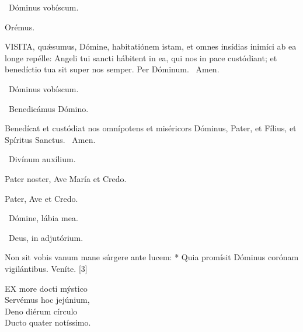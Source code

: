 \V\ Dóminus vobíscum.

Orémus. 

\lettrine[lines=2]{V}{ISITA}, quǽsumus, Dómine, habitatiónem istam, et omnes insídias inimíci ab ea longe repélle: Angeli tui sancti hábitent in ea, qui nos in pace custódiant; et benedíctio tua sit super nos semper. Per Dóminum. \R\ Amen.

\V\ Dóminus vobíscum.

\V\ Benedicámus Dómino.

 Benedícat et custódiat nos omnípotens et miséricors Dóminus, Pater, et Fílius, et Spíritus Sanctus. \R\ Amen.


\V\ Divínum auxílium.

Pater noster, Ave María et Credo.

\sectionornament





Pater, Ave et Credo.

\V\ Dómine, lábia mea.

\V\ Deus, in adjutórium.



 Non sit vobis vanum mane súrgere ante lucem: * Quia promísit Dóminus corónam vigilántibus.  Veníte. [3]


\lettrine[lines=2]{E}{X} more docti mýstico\\
Servémus hoc jejúnium,\\
Deno diérum círculo\\
Ducto quater notíssimo.

